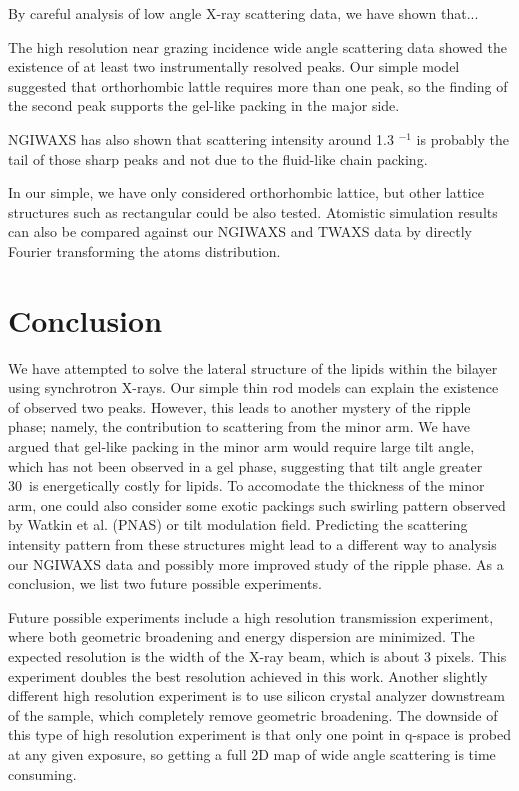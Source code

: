 By careful analysis of low angle X-ray scattering data, we have shown that...

The high resolution near grazing incidence wide angle scattering data showed
the existence of at least two instrumentally resolved peaks. Our simple model
suggested that orthorhombic lattle requires more than one peak, so the finding
of the second peak supports the gel-like packing in the major side.

NGIWAXS has also shown that scattering intensity around 1.3 $^{-1}$ is probably
the tail of those sharp peaks and not due to 
the fluid-like chain packing. 

In our simple, we have only considered orthorhombic lattice, but other lattice
structures such as rectangular could be also tested. Atomistic simulation
results can also be compared against our NGIWAXS and TWAXS data by directly
Fourier transforming the atoms distribution. 

\section{Conclusion}
We have attempted to solve the lateral structure of the lipids within the
bilayer using synchrotron X-rays. Our simple thin rod models can explain
the existence of observed two peaks. However, this leads to another 
mystery of the ripple phase; namely, the contribution to scattering from
the minor arm. We have argued that gel-like packing in the minor arm
would require large tilt angle, which has not been observed in a gel 
phase, suggesting that tilt angle greater 30\textdegree\ is energetically
costly for lipids. To accomodate the thickness of the minor arm, one
could also consider some exotic packings such swirling pattern observed
by Watkin et al. (PNAS) or tilt modulation field. Predicting the scattering
intensity pattern from these structures might lead to a different way
to analysis our NGIWAXS data and possibly more improved study of the 
ripple phase. As a conclusion, we list two future possible experiments.

Future possible experiments
include a high resolution transmission experiment, where both geometric 
broadening and energy dispersion are minimized. The expected resolution 
is the width of the X-ray beam, which is about 3 pixels. This experiment 
doubles the best resolution achieved in this work. 
Another slightly different high resolution experiment is to use silicon 
crystal analyzer downstream of the sample, which completely remove geometric
broadening. The downside of this type of high resolution experiment is that
only one point in q-space is probed at any given exposure, so getting a full
2D map of wide angle scattering is time consuming.  

